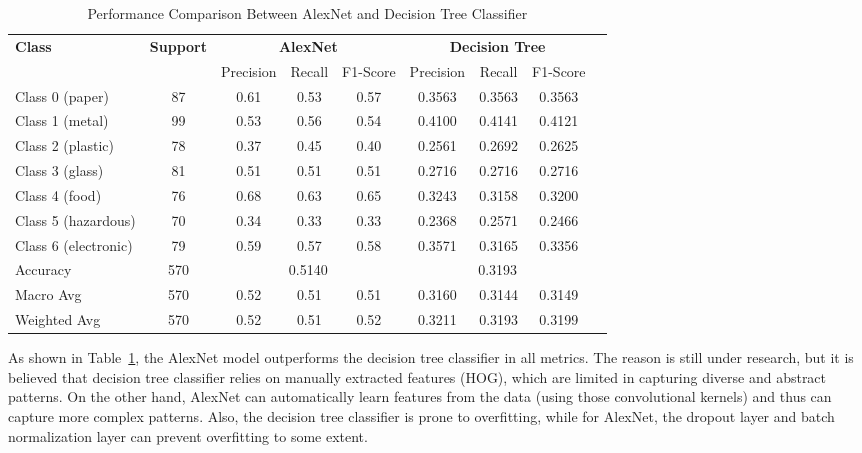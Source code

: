 \documentclass[a4paper,12pt]{article}
\begin{document}
\begin{table}[ht]
	\centering
	\caption{Performance Comparison Between AlexNet and Decision Tree Classifier}
	\begin{tabular}{@{}lcccccccc@{}}
	\toprule
	\textbf{Class} & \textbf{Support} & \multicolumn{3}{c}{\textbf{AlexNet}} & \multicolumn{3}{c}{\textbf{Decision Tree}} \\ 
				   &                  & Precision & Recall & F1-Score       & Precision & Recall & F1-Score \\ \midrule
	Class 0 (paper)        & 87               & 0.61      & 0.53   & 0.57           & 0.3563    & 0.3563 & 0.3563   \\
	Class 1 (metal)        & 99               & 0.53      & 0.56   & 0.54           & 0.4100    & 0.4141 & 0.4121   \\
	Class 2 (plastic)        & 78               & 0.37      & 0.45   & 0.40           & 0.2561    & 0.2692 & 0.2625   \\
	Class 3 (glass)        & 81               & 0.51      & 0.51   & 0.51           & 0.2716    & 0.2716 & 0.2716   \\
	Class 4 (food)        & 76               & 0.68      & 0.63   & 0.65           & 0.3243    & 0.3158 & 0.3200   \\
	Class 5 (hazardous)       & 70               & 0.34      & 0.33   & 0.33           & 0.2368    & 0.2571 & 0.2466   \\
	Class 6 (electronic)       & 79               & 0.59      & 0.57   & 0.58           & 0.3571    & 0.3165 & 0.3356   \\ \midrule
	Accuracy       & 570              & \multicolumn{3}{c}{0.5140}          & \multicolumn{3}{c}{0.3193} \\ 
	Macro Avg      & 570              & 0.52      & 0.51   & 0.51           & 0.3160    & 0.3144 & 0.3149   \\ 
	Weighted Avg   & 570              & 0.52      & 0.51   & 0.52           & 0.3211    & 0.3193 & 0.3199   \\ \bottomrule
	\end{tabular}
	\label{tab:performance_comparison}
\end{table}

As shown in Table~\ref{tab:performance_comparison}, the AlexNet model outperforms the decision tree classifier in all metrics. The reason is still under research, but it is believed that decision tree classifier relies on manually extracted features (HOG), which are limited in capturing diverse and abstract patterns. On the other hand, AlexNet can automatically learn features from the data (using those convolutional kernels) and thus can capture more complex patterns. Also, the decision tree classifier is prone to overfitting, while for AlexNet, the dropout layer and batch normalization layer can prevent overfitting to some extent.
\end{document}
